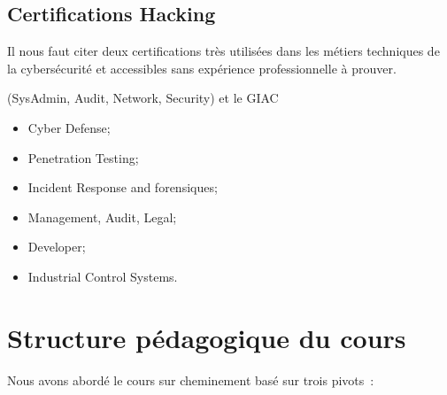 \subsection{Certifications Hacking} 

Il nous faut citer deux certifications très utilisées dans les métiers techniques de la cybersécurité et accessibles sans expérience professionnelle à prouver.

 (SysAdmin, Audit, Network, Security) et le GIAC 

\begin{itemize}
  \item Cyber Defense;
  \item Penetration Testing;
  \item Incident Response and forensiques;
  \item Management, Audit, Legal;
  \item Developer;
  \item Industrial Control Systems.

\end{itemize}



\section {Structure pédagogique du cours}
Nous avons abordé le cours sur cheminement basé sur trois pivots :

